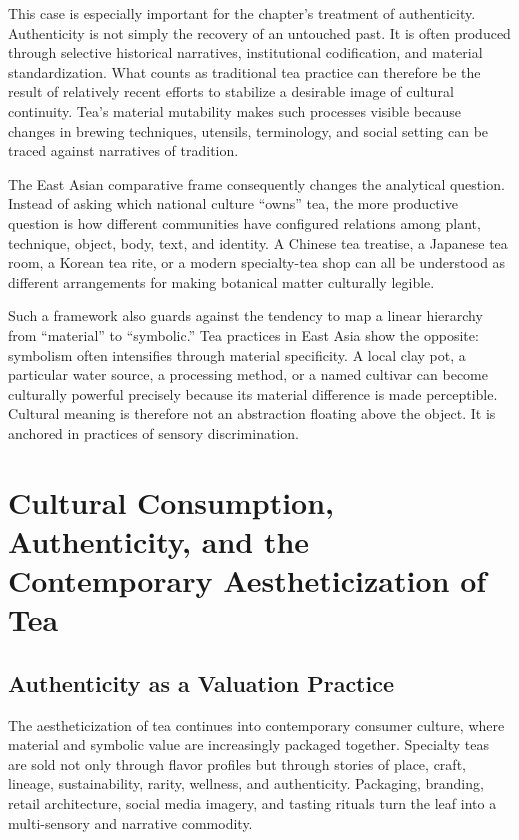 \documentclass[numbers]{IntechOpen-Book}
\begin{document}
This case is especially important for the chapter's treatment of authenticity. Authenticity is not simply the recovery of an untouched past. It is often produced through selective historical narratives, institutional codification, and material standardization. What counts as traditional tea practice can therefore be the result of relatively recent efforts to stabilize a desirable image of cultural continuity. Tea's material mutability makes such processes visible because changes in brewing techniques, utensils, terminology, and social setting can be traced against narratives of tradition.

The East Asian comparative frame consequently changes the analytical question. Instead of asking which national culture ``owns'' tea, the more productive question is how different communities have configured relations among plant, technique, object, body, text, and identity. A Chinese tea treatise, a Japanese tea room, a Korean tea rite, or a modern specialty-tea shop can all be understood as different arrangements for making botanical matter culturally legible.

Such a framework also guards against the tendency to map a linear hierarchy from ``material'' to ``symbolic.'' Tea practices in East Asia show the opposite: symbolism often intensifies through material specificity. A local clay pot, a particular water source, a processing method, or a named cultivar can become culturally powerful precisely because its material difference is made perceptible. Cultural meaning is therefore not an abstraction floating above the object. It is anchored in practices of sensory discrimination.

\section{Cultural Consumption, Authenticity, and the Contemporary Aestheticization of Tea}

\subsection{Authenticity as a Valuation Practice}

The aestheticization of tea continues into contemporary consumer culture, where material and symbolic value are increasingly packaged together. Specialty teas are sold not only through flavor profiles but through stories of place, craft, lineage, sustainability, rarity, wellness, and authenticity. Packaging, branding, retail architecture, social media imagery, and tasting rituals turn the leaf into a multi-sensory and narrative commodity.
\end{document}

